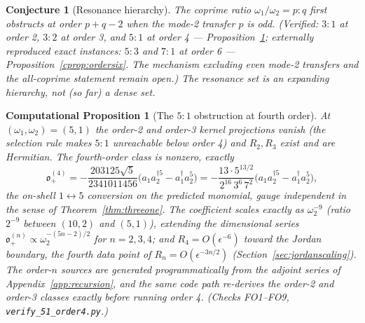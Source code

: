 \documentclass[11pt]{article}
\newtheorem{conjecture}[theorem]{Conjecture}
\newtheorem{cproposition}[theorem]{Computational Proposition}
\theoremstyle{definition}
\theoremstyle{remark}
\newcommand{\w}{\omega}
\newcommand{\dg}{\dagger}
\newcommand{\ob}{\mathfrak o}
\begin{document}
\begin{conjecture}[Resonance hierarchy]\label{conj:hierarchy}
The coprime ratio $\w_1/\w_2=p{:}q$ first obstructs at order $p+q-2$
when the mode-2 transfer $p$ is odd.  (Verified: $3{:}1$ at order 2,
$3{:}2$ at order 3, and $5{:}1$ at order 4 ---
Proposition~\ref{cprop:fiveone}; externally reproduced exact instances:
$5{:}3$ and $7{:}1$ at order 6 --- Proposition~\ref{cprop:ordersix}.
The mechanism excluding even mode-2 transfers and the all-coprime statement
remain open.)  The
resonance set is an expanding hierarchy, not (so far) a dense set.
\end{conjecture}

\begin{cproposition}[The $5{:}1$ obstruction at fourth order]
\label{cprop:fiveone}
At $(\w_1,\w_2)=(5,1)$ the order-2 and order-3 kernel projections
vanish (the selection rule makes $5{:}1$ unreachable below order 4)
and $R_2,R_3$ exist and are Hermitian.  The fourth-order class is
nonzero, exactly
\begin{equation}
\ob_+^{(4)}
=-\frac{203125\sqrt5}{2341011456}
\big(a_1a_2^{\dg5}-a_1^{\dg}a_2^5\big)
=-\frac{13\cdot5^{13/2}}{2^{16}\,3^6\,7^2}
\big(a_1a_2^{\dg5}-a_1^{\dg}a_2^5\big),
\end{equation}
the on-shell $1\leftrightarrow5$ conversion on the predicted monomial,
gauge independent in the sense of Theorem~\ref{thm:threeone}.  The
coefficient scales exactly as $\w_2^{-9}$ (ratio $2^{-9}$ between
$(10,2)$ and $(5,1)$), extending the dimensional series
$\ob_+^{(n)}\propto\w_2^{-(5n-2)/2}$ for $n=2,3,4$; and
$R_4=O(\epsilon^{-6})$ toward the Jordan boundary, the fourth data
point of $R_n=O(\epsilon^{-3n/2})$
(Section~\ref{sec:jordanscaling}).  The order-$n$ sources are
generated programmatically from the adjoint series of
Appendix~\ref{app:recursion}, and the same code path re-derives the
order-2 and order-3 classes exactly before running order 4.
(Checks FO1--FO9, \texttt{verify\_51\_order4.py}.)
\end{cproposition}
\end{document}
